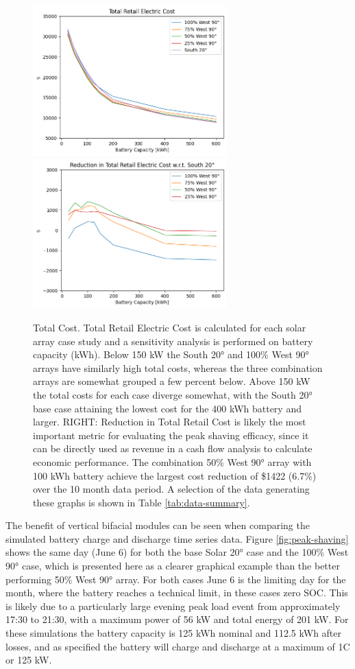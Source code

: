 \documentclass[
]{article}
\begin{document}
\begin{figure}[!h]
  \centering
  \includegraphics[width=7.5cm,height=\textheight]{./images/total cost.png}
  \includegraphics[width=7.5cm,height=\textheight]{./images/total cost reduction.png}
  \caption{Total Cost. Total Retail Electric Cost is calculated for each
  solar array case study and a sensitivity analysis is performed on
  battery capacity (kWh). Below 150 kW the South 20° and 100\% West 90°
  arrays have similarly high total costs, whereas the three combination
  arrays are somewhat grouped a few percent below. Above 150 kW the total
  costs for each case diverge somewhat, with the South 20° base case
  attaining the lowest cost for the 400 kWh battery and larger.
  RIGHT: Reduction in Total Retail Cost is likely the most important metric for
  evaluating the peak shaving efficacy, since it can be directly used as
  revenue in a cash flow analysis to calculate economic performance. The
  combination 50\% West 90° array with 100 kWh battery achieve the largest
  cost reduction of \$1422 (6.7\%) over the 10 month data period. A
  selection of the data generating these graphs is shown in Table \ref{tab:data-summary}.}
  \label{fig:total-cost}
\end{figure}

The benefit of vertical bifacial modules can be seen when comparing the
simulated battery charge and discharge time series data. Figure \ref{fig:peak-shaving} shows
the same day (June 6) for both the base Solar 20° case and the 100\%
West 90° case, which is presented here as a clearer graphical example
than the better performing 50\% West 90° array. For both cases June 6 is
the limiting day for the month, where the battery reaches a technical
limit, in these cases zero SOC. This is likely due to a particularly
large evening peak load event from approximately 17:30 to 21:30, with a
maximum power of 56 kW and total energy of 201 kW. For these simulations
the battery capacity is 125 kWh nominal and 112.5 kWh after losses, and
as specified the battery will charge and discharge at a maximum of 1C or
125 kW.
\end{document}
